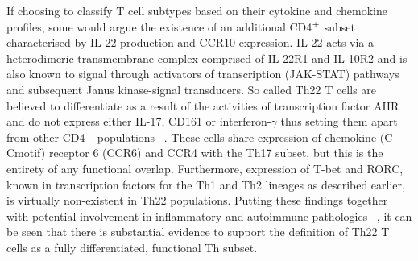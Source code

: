 If choosing to classify T cell subtypes based on their cytokine and chemokine profiles, some would argue the existence of an additional CD4$\textsuperscript{+}$ subset characterised by IL-22 production and CCR10 expression. IL-22 acts via a heterodimeric transmembrane complex comprised of IL-22R1 and IL-10R2 and is also known to signal through activators of transcription (JAK-STAT) pathways and subsequent Janus kinase-signal transducers. So called Th22 T cells are believed to differentiate as a result of the activities of transcription factor AHR and do not express either IL-17, CD161 or interferon-$\gamma$ thus setting them apart from other CD4$\textsuperscript{+}$ populations ~\autocite{Tia2013}. These cells share expression of chemokine (C-Cmotif) receptor 6 (CCR6) and CCR4 with the Th17 subset, but this is the entirety of any functional overlap. Furthermore, expression of  T-bet and RORC, known in transcription factors for the Th1 and Th2 lineages as described earlier, is virtually non-existent in Th22 populations. Putting these findings together with potential involvement in inflammatory and autoimmune pathologies ~\autocite{Tia2013}, it can be seen that there is substantial evidence to support the definition of Th22 T cells as a fully differentiated, functional Th subset. 


